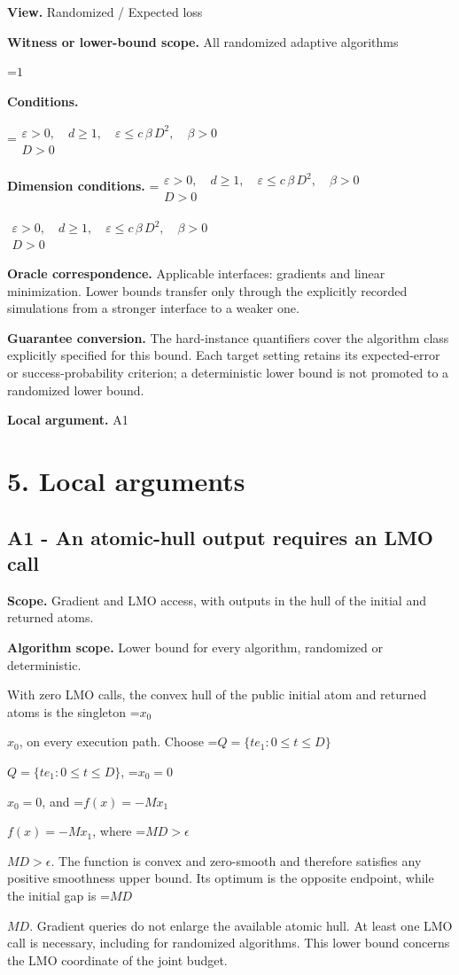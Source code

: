 \documentclass[10pt,a4paper]{article}
\newcommand{\AtlasMath}[1]{\par\begingroup\centering\setbox0=\hbox{$\displaystyle #1$}\ifdim\wd0>1.4\linewidth\typeout{ATLAS WIDE FORMULA: \the\wd0}\fi\ifdim\wd0>\linewidth\resizebox{\linewidth}{!}{\box0}\else\box0\fi\par\endgroup}
\newcommand{\AtlasInlineMath}[1]{\begingroup\setbox0=\hbox{$#1$}\ifdim\wd0>.4\linewidth\endgroup\AtlasMath{#1}\else\endgroup$#1$\fi}
\begin{document}
\textbf{View.} Randomized / Expected loss

\textbf{Witness or lower-bound scope.} All randomized adaptive algorithms

\AtlasMath{1}
\textbf{Conditions.} 
\AtlasMath{\begin{gathered}\varepsilon > 0,\quad d \ge 1,\quad \varepsilon \le c\,\beta\,{D}^{2},\quad \beta > 0\\D > 0\end{gathered}}


\textbf{Dimension conditions.} \AtlasInlineMath{\begin{gathered}\varepsilon > 0,\quad d \ge 1,\quad \varepsilon \le c\,\beta\,{D}^{2},\quad \beta > 0\\D > 0\end{gathered}}

\textbf{Oracle correspondence.} Applicable interfaces: gradients and linear minimization. Lower bounds transfer only through the explicitly recorded simulations from a stronger interface to a weaker one.

\textbf{Guarantee conversion.} The hard-instance quantifiers cover the algorithm class explicitly specified for this bound. Each target setting retains its expected-error or success-probability criterion; a deterministic lower bound is not promoted to a randomized lower bound.

\textbf{Local argument.} A1

\section{5. Local arguments}
\subsection{A1 - An atomic-hull output requires an LMO call}
\textbf{Scope.} Gradient and LMO access, with outputs in the hull of the initial and returned atoms.

\textbf{Algorithm scope.} Lower bound for every algorithm, randomized or deterministic.

With zero LMO calls, the convex hull of the public initial atom and returned atoms is the singleton \AtlasInlineMath{x_0}, on every execution path. Choose
\AtlasInlineMath{Q=\{te_1:0\le t\le D\}}, \AtlasInlineMath{x_0=0}, and \AtlasInlineMath{f(x)=-Mx_1}, where \AtlasInlineMath{MD>\epsilon}.
The function is convex and zero-smooth and therefore satisfies any positive smoothness upper bound. Its optimum is the opposite endpoint, while the initial gap is \AtlasInlineMath{MD}. Gradient queries do not enlarge the available atomic hull. At least one LMO call is necessary, including for randomized algorithms. This lower bound concerns the LMO coordinate of the joint budget.
\end{document}
